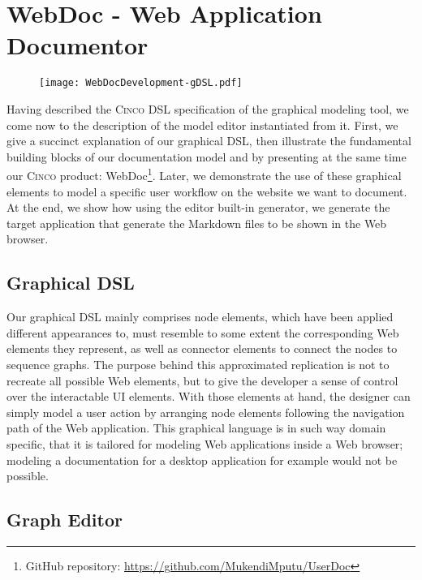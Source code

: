 \chapter{WebDoc - Web Application Documentor}\label{ch:CP}

\begin{figure}[h]
    \centering
    \texttt{[image: WebDocDevelopment-gDSL.pdf]}
    \label{fig:webDoc}
\end{figure}

Having described the \textsc{Cinco} DSL specification of the graphical modeling tool, we come now to the description of the model editor instantiated from it. First, we give a succinct explanation of our graphical DSL, then illustrate the fundamental building blocks of our documentation model and by presenting at the same time our \textsc{Cinco} product: WebDoc\footnote{GitHub repository: \url{https://github.com/MukendiMputu/UserDoc}}. Later, we demonstrate the use of these graphical elements to model a specific user workflow on the website we want to document. At the end, we show how using the editor built-in generator, we generate the target application that generate the Markdown files to be shown in the Web browser.

\section{Graphical DSL}\label{sec:gDSL}

Our graphical DSL mainly comprises node elements, which have been applied different appearances to, must resemble to some extent the corresponding Web elements they represent, as well as connector elements to connect the nodes to sequence graphs. The purpose behind this approximated replication is not to recreate all possible Web elements, but to give the developer a sense of control over the interactable UI elements. With those elements at hand, the designer can simply model a user action by arranging node elements following the navigation path of the Web application. This graphical language is in such way domain specific, that it is tailored for modeling Web applications inside a Web browser; modeling a documentation for a desktop application for example would not be possible.

\section{Graph Editor}\label{sec:graphEditor}

